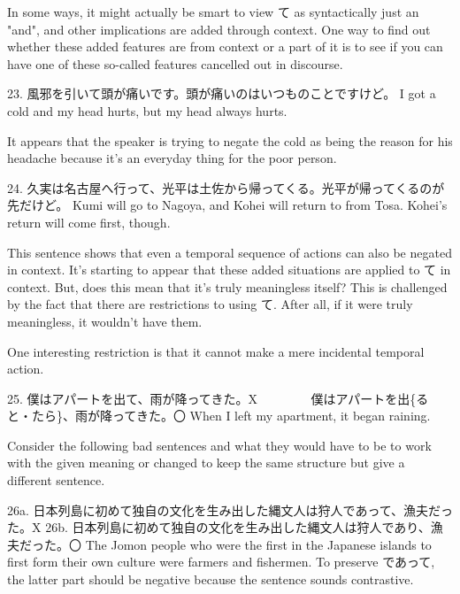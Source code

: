 \par{ In some ways, it might actually be smart to view て as syntactically just an "and", and other implications are added through context. One way to find out whether these added features are from context or a part of it is to see if you can have one of these so-called features cancelled out in discourse. }

\par{23. 風邪を引いて頭が痛いです。頭が痛いのはいつものことですけど。 \hfill\break
I got a cold and my head hurts, but my head always hurts. }

\par{ It appears that the speaker is trying to negate the cold as being the reason for his headache because it's an everyday thing for the poor person. }

\par{24. 久実は名古屋へ行って、光平は土佐から帰ってくる。光平が帰ってくるのが先だけど。 \hfill\break
Kumi will go to Nagoya, and Kohei will return to from Tosa. Kohei's return will come first, though. }

\par{ This sentence shows that even a temporal sequence of actions can also be negated in context. It's starting to appear that these added situations are applied to て in context. But, does this mean that it's truly meaningless itself? This is challenged by the fact that there are restrictions to using て. After all, if it were truly meaningless, it wouldn't have them. }

\par{ One interesting restriction is that it cannot make a mere incidental temporal action. }

\par{25. 僕はアパートを出て、雨が降ってきた。X 　　　\textrightarrow 　僕はアパートを出\{ると・たら\}、雨が降ってきた。〇 \hfill\break
When I left my apartment, it began raining. }

\par{ Consider the following bad sentences and what they would have to be to work with the given meaning or changed to keep the same structure but give a different sentence. }

\par{26a. 日本列島に初めて独自の文化を生み出した縄文人は狩人であって、漁夫だった。X \hfill\break
26b. 日本列島に初めて独自の文化を生み出した縄文人は狩人であり、漁夫だった。〇 \hfill\break
The Jomon people who were the first in the Japanese islands to first form their own culture were farmers and fishermen. \hfill\break
 \hfill\break
 To preserve であって, the latter part should be negative because the sentence sounds contrastive. }

